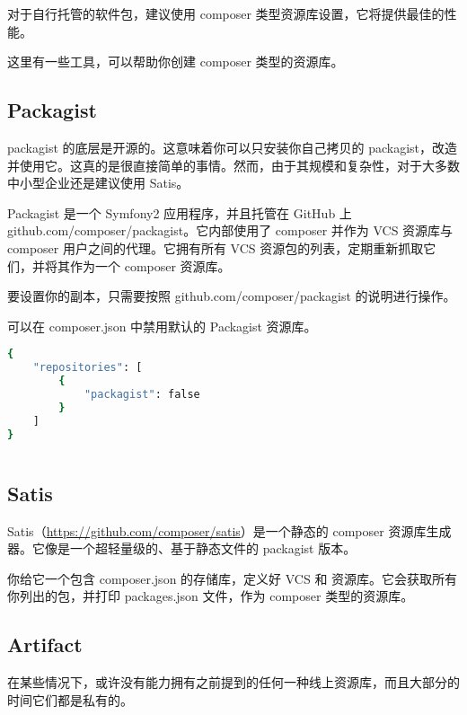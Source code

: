 对于自行托管的软件包，建议使用 composer 类型资源库设置，它将提供最佳的性能。

这里有一些工具，可以帮助你创建 composer 类型的资源库。

\subsection{Packagist}

packagist 的底层是开源的。这意味着你可以只安装你自己拷贝的 packagist，改造并使用它。这真的是很直接简单的事情。然而，由于其规模和复杂性，对于大多数中小型企业还是建议使用 Satis。

Packagist 是一个 Symfony2 应用程序，并且托管在 GitHub 上 github.com/composer/packagist。它内部使用了 composer 并作为 VCS 资源库与 composer 用户之间的代理。它拥有所有 VCS 资源包的列表，定期重新抓取它们，并将其作为一个 composer 资源库。

要设置你的副本，只需要按照 github.com/composer/packagist 的说明进行操作。

可以在 composer.json 中禁用默认的 Packagist 资源库。

\begin{lstlisting}[language=bash]
{
    "repositories": [
        {
            "packagist": false
        }
    ]
}
\end{lstlisting}






\begin{lstlisting}[language=bash]

\end{lstlisting}

\subsection{Satis}

Satis（\url{https://github.com/composer/satis}）是一个静态的 composer 资源库生成器。它像是一个超轻量级的、基于静态文件的 packagist 版本。

你给它一个包含 composer.json 的存储库，定义好 VCS 和 资源库。它会获取所有你列出的包，并打印 packages.json 文件，作为 composer 类型的资源库。



\subsection{Artifact}

在某些情况下，或许没有能力拥有之前提到的任何一种线上资源库，而且大部分的时间它们都是私有的。

